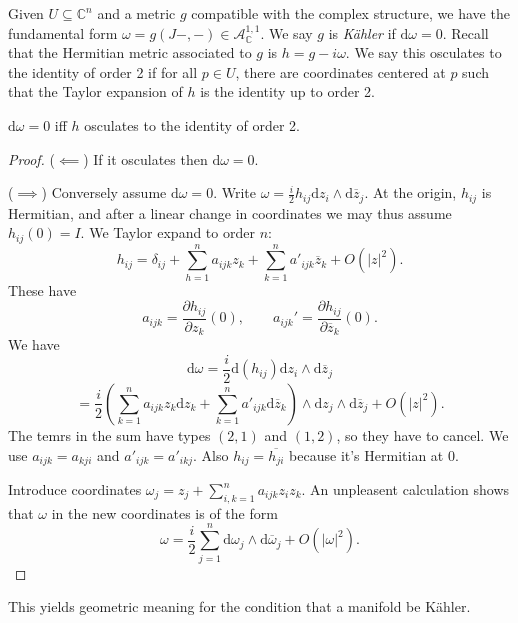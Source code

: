 
Given $U\subseteq \mathbb{C} ^n$ and a metric $g$ compatible with the complex structure, we have the fundamental form $\omega =g(J-,-)\in \mathcal{A} ^{1,1}_\mathbb{C} $. We say $g$ is \emph{K\"ahler} if $\mathrm{d} \omega =0$. Recall that the Hermitian metric associated to $g$ is $h=g-i\omega $. We say this osculates to the identity of order 2 if for all $p\in U$, there are coordinates centered at $p$ such that the Taylor expansion of $h$ is the identity up to order 2.

\begin{proposition}\label{???}
	$\mathrm{d} \omega =0$ iff $h$ osculates to the identity of order 2.
\end{proposition}
\begin{proof}
	($\impliedby $) If it osculates then $\mathrm{d} \omega =0$.

	($\implies $) Conversely assume $\mathrm{d} \omega =0$. Write $\omega =\frac{i}{2} h_{ij} \mathrm{d} z_i \wedge \mathrm{d} \overline{z} _j$. At the origin, $h_{ij} $ is Hermitian, and after a linear change in coordinates we may thus assume $h_{ij} (0)=I$. We Taylor expand to order $n$:
	\[
		h_{ij} =\delta _{ij} + \sum_{h=1}^{n} a_{ijk} z_k + \sum_{k=1}^{n} a'_{ijk} \overline{z} _k + O(\left| z \right| ^2)
	.\]
	These have
	\[
		a_{ijk} =\frac{\partial h_{ij} }{\partial z_k}(0),\qquad a_{ijk} '=\frac{\partial h_{ij} }{\partial \overline{z} _k} (0)
	.\]
	We have
	\[
		\mathrm{d} \omega  = \frac{i}{2} \mathrm{d} (h_{ij} )\mathrm{d} z_i \wedge \mathrm{d} \overline{z} _j
	\]
	\[
		=\frac{i}{2} \left( \sum_{k=1}^{n} a_{ijk} z_k \mathrm{d} z_k + \sum_{k=1}^{n} a'_{ijk} \mathrm{d} \overline{z} _k \right) \wedge \mathrm{d} z_j \wedge \mathrm{d} \overline{z} _j + O(\left| z \right| ^2)
	.\]
	The temrs in the sum have types $(2,1)$ and $(1,2)$, so they have to cancel. We use $a_{ijk} =a_{kji} $ and $a'_{ijk} =a'_{ikj} $. Also $h_{ij} =\overline{h_{ji} } $ because it's Hermitian at 0.

	Introduce coordinates $\omega _j = z_j + \sum_{i,k=1}^n a_{ijk} z_iz_k$. An unpleasent calculation shows that $\omega $ in the new coordinates is of the form
	\[
		\omega =\frac{i}{2} \sum_{j=1}^{n} \mathrm{d} \omega _j \wedge \mathrm{d} \overline{\omega } _j + O(\left| \omega  \right| ^2)
	.\]
\end{proof}

This yields geometric meaning for the condition that a manifold be K\"ahler.

